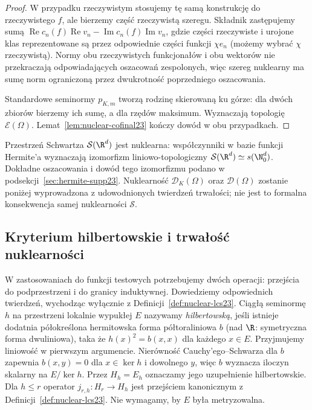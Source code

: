 \begin{proof}
W przypadku rzeczywistym stosujemy tę samą konstrukcję
do rzeczywistego $f$, ale bierzemy część rzeczywistą
szeregu. Składnik zastępujemy sumą
$\operatorname{Re}c_n(f)\operatorname{Re}v_n-
\operatorname{Im}c_n(f)\operatorname{Im}v_n$,
gdzie części rzeczywiste i urojone klas reprezentowane
są przez odpowiednie części funkcji $\chi e_n$
(możemy wybrać $\chi$ rzeczywistą).
Normy obu rzeczywistych funkcjonałów i obu wektorów
nie przekraczają odpowiadających oszacowań zespolonych,
więc szereg nuklearny ma sumę norm ograniczoną przez
dwukrotność poprzedniego oszacowania.

Standardowe seminormy $p_{K,m}$ tworzą rodzinę
skierowaną ku górze: dla dwóch zbiorów bierzemy
ich sumę, a dla rzędów maksimum.
Wyznaczają topologię $\mathcal E(\Omega)$.
Lemat~\ref{lem:nuclear-cofinal23} kończy dowód
w obu przypadkach.
\end{proof}

\begin{uwaga}
\label{rem:hermite-nuclear23}
Przestrzeń Schwartza $\mathcal S(\R^d)$ jest nuklearna:
współczynniki w bazie funkcji Hermite'a wyznaczają
izomorfizm liniowo-topologiczny
$\mathcal S(\R^d)\simeq s(\N_0^d)$.
Dokładne oszacowania i dowód tego izomorfizmu podano
w podsekcji~\ref{sec:hermite-supp23}.
Nuklearność $\mathcal D_K(\Omega)$ oraz
$\mathcal D(\Omega)$ zostanie poniżej wyprowadzona
z udowodnionych twierdzeń trwałości; nie jest to
formalna konsekwencja samej nuklearności $\mathcal S$.
\end{uwaga}

\subsection{Kryterium hilbertowskie i trwałość nuklearności}
\label{subsec:nuclear-permanence23}

W zastosowaniach do funkcji testowych potrzebujemy dwóch operacji:
przejścia do podprzestrzeni i do granicy induktywnej. Dowiedziemy
odpowiednich twierdzeń, wychodząc wyłącznie z
Definicji~\ref{def:nuclear-lcs23}. Ciągłą seminormę $h$ na przestrzeni lokalnie wypukłej $E$
nazywamy \emph{hilbertowską}, jeśli istnieje dodatnia
półokreślona hermitowska forma półtoraliniowa $b$ (nad $\R$:
symetryczna forma dwuliniowa), taka że $h(x)^2=b(x,x)$
dla każdego $x\in E$. Przyjmujemy liniowość w pierwszym
argumencie. Nierówność Cauchy'ego--Schwarza dla $b$
zapewnia $b(x,y)=0$ dla $x\in\ker h$ i dowolnego $y$,
więc $b$ wyznacza iloczyn skalarny na $E/\ker h$.
Przez $H_h=E_h$ oznaczamy jego uzupełnienie hilbertowskie.
Dla $h\le r$ operator $j_{r,h}:H_r\to H_h$ jest
przejściem kanonicznym z Definicji~\ref{def:nuclear-lcs23}.
Nie wymagamy, by $E$ była metryzowalna.

